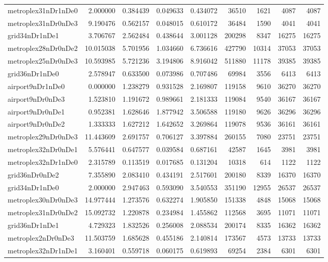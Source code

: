 \begin{longtable}{|l|r|r|r|r|r|r|r|r|}
metroplex31nDr1nDe0 & 2.000000 & 0.384439 & 0.049633 & 0.434072 & 36510 & 1621 & 4087 & 4087 \\
metroplex31nDr0nDe3 & 9.190476 & 0.562157 & 0.048015 & 0.610172 & 36484 & 1590 & 4041 & 4041 \\
grid34nDr1nDe1 & 3.706767 & 2.562484 & 0.438644 & 3.001128 & 200298 & 8347 & 16275 & 16275 \\
metroplex28nDr0nDe2 & 10.015038 & 5.701956 & 1.034660 & 6.736616 & 427790 & 10314 & 37053 & 37053 \\
metroplex25nDr0nDe3 & 10.593985 & 5.721236 & 3.194806 & 8.916042 & 511880 & 11178 & 39385 & 39385 \\
grid36nDr1nDe0 & 2.578947 & 0.633500 & 0.073986 & 0.707486 & 69984 & 3556 & 6413 & 6413 \\
airport9nDr1nDe0 & 0.000000 & 1.238279 & 0.931528 & 2.169807 & 119158 & 9610 & 36270 & 36270 \\
airport9nDr0nDe3 & 1.523810 & 1.191672 & 0.989661 & 2.181333 & 119084 & 9540 & 36167 & 36167 \\
airport9nDr0nDe1 & 0.952381 & 1.628646 & 1.877942 & 3.506588 & 119180 & 9626 & 36296 & 36296 \\
airport9nDr0nDe2 & 1.333333 & 1.627212 & 1.642652 & 3.269864 & 119078 & 9536 & 36161 & 36161 \\
metroplex29nDr0nDe3 & 11.443609 & 2.691757 & 0.706127 & 3.397884 & 260155 & 7080 & 23751 & 23751 \\
metroplex32nDr0nDe1 & 5.576441 & 0.647577 & 0.039584 & 0.687161 & 42587 & 1645 & 3981 & 3981 \\
metroplex32nDr1nDe0 & 2.315789 & 0.113519 & 0.017685 & 0.131204 & 10318 & 614 & 1122 & 1122 \\
grid36nDr0nDe2 & 7.355890 & 2.083410 & 0.434191 & 2.517601 & 200180 & 8339 & 16370 & 16370 \\
grid34nDr1nDe0 & 2.000000 & 2.947463 & 0.593090 & 3.540553 & 351190 & 12955 & 26537 & 26537 \\
metroplex30nDr0nDe3 & 14.977444 & 1.273576 & 0.632274 & 1.905850 & 151338 & 4848 & 15068 & 15068 \\
metroplex31nDr0nDe2 & 15.092732 & 1.220878 & 0.234984 & 1.455862 & 112568 & 3695 & 11071 & 11071 \\
grid36nDr1nDe1 & 4.729323 & 1.832526 & 0.256008 & 2.088534 & 200174 & 8335 & 16362 & 16362 \\
metroplex2nDr0nDe3 & 11.503759 & 1.685628 & 0.455186 & 2.140814 & 173567 & 4573 & 13733 & 13733 \\
metroplex32nDr1nDe1 & 3.160401 & 0.559718 & 0.060175 & 0.619893 & 69254 & 2384 & 6301 & 6301 \\

\end{longtable}
